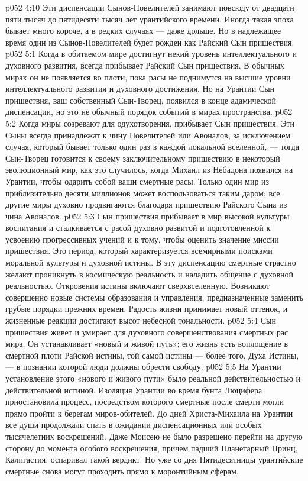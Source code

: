 \vs p052 4:10 \pc Эти диспенсации Сынов\hyp{}Повелителей занимают повсюду от двадцати пяти тысяч до пятидесяти тысяч лет урантийского времени. Иногда такая эпоха бывает много короче, а в редких случаях --- даже дольше. Но в надлежащее время один из Сынов\hyp{}Повелителей будет рожден как Райский Сын пришествия.
\vs p052 5:1 Когда в обитаемом мире достигнут некий уровень интеллектуального и духовного развития, всегда прибывает Райский Сын пришествия. В обычных мирах он не появляется во плоти, пока расы не поднимутся на высшие уровни интеллектуального развития и духовного достижения. Но на Урантии Сын пришествия, ваш собственный Сын\hyp{}Творец, появился в конце адамической диспенсации, но это не обычный порядок событий в мирах пространства.
\vs p052 5:2 Когда миры созревают для одухотворения, прибывает Сын пришествия. Эти Сыны всегда принадлежат к чину Повелителей или Авоналов, за исключением случая, который бывает только один раз в каждой локальной вселенной, --- тогда Сын\hyp{}Творец готовится к своему заключительному пришествию в некоторый эволюционный мир, как это случилось, когда Михаил из Небадона появился на Урантии, чтобы одарить собой ваши смертные расы. Только один мир из приблизительно десяти миллионов может воспользоваться таким даром; все другие миры духовно продвигаются благодаря пришествию Райского Сына из чина Авоналов.
\vs p052 5:3 \pc Сын пришествия прибывает в мир высокой культуры воспитания и сталкивается с расой духовно развитой и подготовленной к усвоению прогрессивных учений и к тому, чтобы оценить значение миссии пришествия. Это период, который характеризуется всемирными поисками моральной культуры и духовной истины. В эту диспенсацию смертные страстно желают проникнуть в космическую реальность и наладить общение с духовной реальностью. Откровения истины включают сверхвселенную. Возникают совершенно новые системы образования и управления, предназначенные заменить грубые порядки прежних времен. Радость жизни принимает новый оттенок, и жизненные реакции достигают высот небесной тональности.
\vs p052 5:4 Сын пришествия живет и умирает для духовного совершенствования смертных рас мира. Он устанавливает «новый и живой путь»; его жизнь есть воплощение в смертной плоти Райской истины, той самой истины --- более того, Духа Истины, --- в познании которой люди должны обрести свободу.
\vs p052 5:5 На Урантии установление этого «нового и живого пути» было реальной действительностью и действительной истиной. Изоляция Урантии во время бунта Люцифера приостановила процесс, посредством которого смертные после смерти могли прямо пройти к берегам миров\hyp{}обителей. До дней Христа\hyp{}Михаила на Урантии все души продолжали спать в ожидании диспенсационных или особых тысячелетних воскрешений. Даже Моисею не было разрешено перейти на другую сторону до момента особого воскрешения, причем падший Планетарный Принц, Калигастия, оспаривал такой вердикт. Но уже со дня Пятидесятницы урантийские смертные снова могут проходить прямо к моронтийным сферам.
